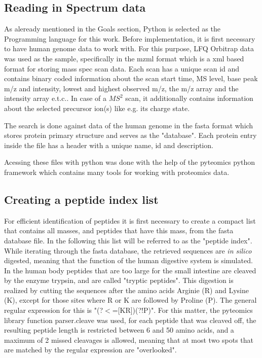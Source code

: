 \documentclass[11pt]{article}
\begin{document}
\subsection{Reading in Spectrum data}

As aleready mentioned in the Goals section, Python is selected as the Programming language for this work. Before implementation, it is first necessary to have human genome data to work with. For this purpose, LFQ Orbitrap data was used as the sample, specifically in the mzml format which is a xml based format for storing mass spec scan data. Each scan has a unique scan id and contains binary coded information about the scan start time, MS level, base peak m/z and intensity, lowest and highest observed m/z, the m/z array and the intensity array e.t.c.. In case of a \(MS^2\) scan, it additionally contains information about the selected precursor ion(s) like e.g. its charge state.

The search is done against data of the human genome in the fasta format which stores protein primary structure and serves as the "database". Each protein entry inside the file has a header with a unique name, id and description.

Acessing these files with python was done with the help of the pyteomics python framework \cite{pyteomics, pyteomics-five-years} which contains many tools for working with proteomics data. 

\subsection{Creating a peptide index list}
For efficient identification of peptides it is first necessary to create a compact list that contains all masses, and peptides that have this mass, from the fasta database file. In the following this list will be referred to as the "peptide index". While iterating through the fasta database, the retrieved sequences are \textit{in silico} digested, meaning that the function of the human digestive system is simulated. In the human body peptides that are too large for the small intestine are cleaved by the enzyme trypsin, and are called "tryptic peptides". This digestion is realized by cutting the sequences after the amino acids Arginie (R) and Lysine (K), except for those sites where R or K are followed by Proline (P). The general regular expression for this is "(?$<$=[KR])(?!P)". For this matter, the pyteomics library function parser.cleave was used, for each peptide that was cleaved off, the resulting peptide length is restricted between 6 and 50 amino acids, and a maximum of 2 missed cleavages is allowed, meaning that at most two spots that are matched by the regular expression are "overlooked". 
\end{document}
